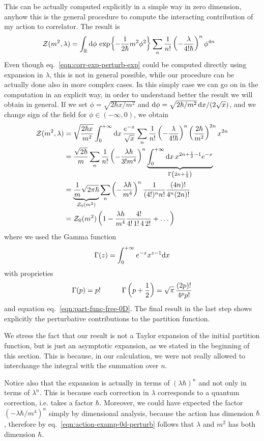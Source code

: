 \documentclass[../main/main.tex]{subfiles}
\begin{document}
This can be actually computed explicitly in a simple way in zero dimension, anyhow this is the general procedure to compute the interacting contribution of my action to correlator. The result is
\begin{align*}
\mathcal Z(m^2,\lambda)
&=\int_{\mathbb{R}}\textup{d}\phi \,\exp{-\frac1{2\hbar}m^2\phi^2}\sum_n\frac1{n!}\left(-\frac\lambda{4!\hbar}\right)^n\phi^{4n}
\end{align*}
Even though eq.~\eqref{eqn:corr-exp-perturb-exp} could be computed directly using expansion in $\lambda$, this is not in general possible, while our procedure can be actually done also in more complex cases. In this simply case we can go on in the computation in an explicit way, in order to understand better the result we will obtain in general. If we set $\phi=\sqrt{2\hbar x/m^2}$ and $\textup{d}\phi=\sqrt{2\hbar/m^2}\,\textup{d} x/(2\sqrt x)$, and we change sign of the field for $\phi\in(-\infty,0)$, we obtain
\begin{align*}
\mathcal Z(m^2,\lambda)
&=\sqrt{\frac{2\hbar x}{m^2}}\int_0^{+\infty}\textup{d} x\,\frac{e^{-x}}{\sqrt x}\sum_n\frac1{n!}\left(-\frac{\lambda}{4!\hbar}\right)^n\left(\frac{2\hbar}{m^2}\right)^{2n}x^{2n}\\
&=\frac{\sqrt{2\hbar}}m\sum_n\frac1{n!}\left(-\frac{\lambda\hbar}{3!m^4}\right)^n\underbrace{\int_0^{+\infty}\textup{d} x\,x^{2n+\frac12-1}e^{-x}}_{\Gamma\left(2n+\frac12\right)}\\
&=\underbrace{\frac1m\sqrt{2\pi\hbar}}_{\mathcal Z_0(m^2)}\sum_n\left(-\frac{\lambda\hbar}{m^4}\right)^n\frac1{(4!)^nn!}\frac{(4n)!}{4^n(2n)!}\\
&=\mathcal Z_0(m^2)\left(1-\frac{\lambda\hbar}{m^4}\frac{4!}{4!\,1!\,4\,2!}+\dots\right)
\end{align*}
where we used the Gamma function
\[\Gamma(z)=\int_0^{+\infty}e^{-x}x^{z-1}\textup{d} x\]
with proprieties
\[\Gamma(p)=p!\qquad\quad\Gamma\left(p+\frac12\right)=\sqrt\pi\,\frac{(2p)!}{4^pp!}\]
and equation eq.~\eqref{eqn:part-func-free-0D}. The final result in the last step shows explicitly the perturbative contributions to the partition function. 

We stress the fact that our result is not a Taylor expansion of the initial partition function, but is just an asymptotic expansion, as we stated in the beginning of this section. This is because, in our calculation, we were not really allowed to interchange the integral with the summation over $n$. 

Notice also that the expansion is actually in terms of $(\lambda\hbar)^n$ and not only in terms of $\lambda^n$. This is because each correction in $\lambda$ corresponds to a quantum correction, i.e. takes a factor $\hbar$. Moreover, we could have expected the factor $(-\lambda\hbar/m^4)^n$ simply by dimensional analysis, because the action has dimension $\hbar$, therefore by eq.~\eqref{eqn:action-examp-0d-perturb} follows that $\lambda$ and $m^2$ has both dimension $\hbar$.
\end{document}
